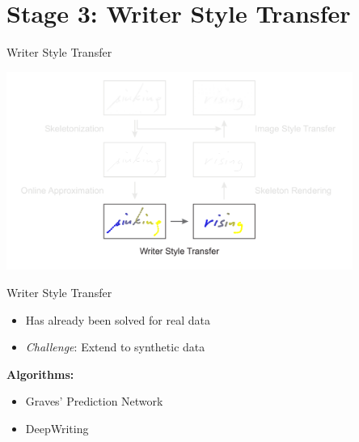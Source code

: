 \documentclass[aspectratio=169]{beamer}
\begin{document}
\section{Stage 3: Writer Style Transfer}
\begin{frame}{Writer Style Transfer}
\begin{center}
\vspace{-1em}
\includegraphics[width=0.85\textwidth]{assets/pipeline/pipeline_writerstyle.pdf}
\end{center}
\end{frame}




\begin{frame}{Writer Style Transfer}
\begin{itemize}
\item Has already been solved for real data
\item \emph{Challenge}: Extend to synthetic data
\end{itemize}
\vspace{1em}
\textbf{Algorithms:}
\begin{itemize}
\item Graves' Prediction Network
\item DeepWriting
\end{itemize}
\end{frame}
\end{document}
